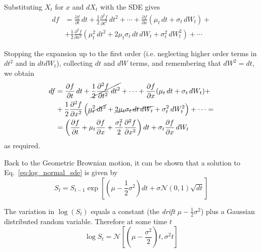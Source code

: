 \documentclass[12pt,a4paper]{book}
\begin{document}
Substituting $X_t$ for $x$ and $dX_t$ with the SDE gives
\begin{equation*}
\begin{aligned}
df&={\frac {\partial f}{\partial t}}\,dt+{\frac {1}{2}}{\frac {\partial ^{2}f}{\partial t^{2}}}\,dt^{2}+\cdots +{\frac {\partial f}{\partial x}}(\mu _{t}\,dt+\sigma _{t}\,dW_{t})+\\
&+{\frac {1}{2}}{\frac {\partial ^{2}f}{\partial x^{2}}}\left(\mu _{t}^{2}\,dt^{2}+2\mu _{t}\sigma _{t}\,dt\,dW_{t}+\sigma _{t}^{2}\,dW_{t}^{2}\right)+\cdots
\end{aligned}
\end{equation*}

Stopping the expansion up to the first order (i.e. neglecting higher order terms in $dt^2$ and in $dt dW_t$), collecting $dt$ and $dW$ terms, and remembering that $dW^2=dt$, we obtain
\begin{equation*}
\begin{aligned}
df&={\frac {\partial f}{\partial t}}\,dt+\cancel{{\frac {1}{2}}{\frac {\partial ^{2}f}{\partial t^{2}}}\,dt^{2}}+\cdots +{\frac {\partial f}{\partial x}}(\mu _{t}\,dt+\sigma _{t}\,dW_{t})+\\
&+{\frac {1}{2}}{\frac {\partial ^{2}f}{\partial x^{2}}}\left(\cancel{\mu _{t}^{2}\,dt^{2}}+\cancel{2\mu _{t}\sigma _{t}\,dt\,dW_{t}}+\sigma _{t}^{2}\,dW_{t}^{2}\right)+\cdots =\\
&=\left({\frac {\partial f}{\partial t}}+\mu _{t}{\frac {\partial f}{\partial x}}+{\frac {\sigma _{t}^{2}}{2}}{\frac {\partial ^{2}f}{\partial x^{2}}}\right)dt+\sigma _{t}{\frac {\partial f}{\partial x}}\,dW_{t}
\end{aligned}
\end{equation*}
as required.

Back to the Geometric Brownian motion, it can be shown that a solution to Eq.~\ref{eq:log_normal_sde} is given by 
\begin{equation}
S_t = S_{t-1}\exp\left[\left(\mu-\frac{1}{2}\sigma^2\right)dt + \sigma\mathcal{N}(0,1)\sqrt{dt}\right] 
\label{eq:lognormal_solution}
\end{equation}

The variation in $\log(S_t)$ equals a constant (the \emph{drift} $\mu-\frac{1}{2}\sigma^2$) plus a Gaussian distributed random variable. Therefore at some time $t$
\begin{equation*}
\log S_t = \mathcal{N}\left[\left(\mu -\frac{\sigma^2}{2}\right)t, \sigma^2 t\right]
\end{equation*}
\end{document}
